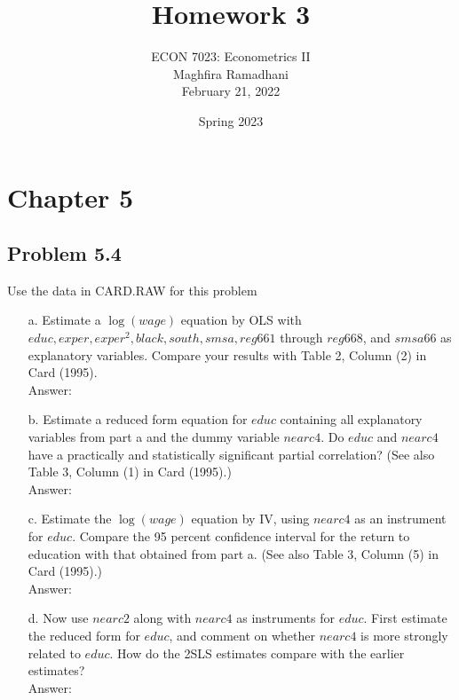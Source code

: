 \documentclass[10pt]{article}
\begin{document}
 
\title{Homework 3}
\author{ECON 7023: Econometrics II\\
Maghfira Ramadhani\\
February 21, 2022}
\date{Spring 2023}
\maketitle

\section*{Chapter 5}
\subsection*{Problem 5.4}
Use the data in CARD.RAW for this problem
\begin{enumerate}
\item[a.] Estimate a $\log(wage)$ equation by OLS with $educ, exper, exper^2, black, south, smsa, reg661$ through $reg668$, and $smsa66$ as explanatory variables. Compare your results with Table 2, Column (2) in Card (1995).
\\ Answer: \\


\item[b.] Estimate a reduced form equation for $educ$ containing all explanatory variables from part a and the dummy variable $nearc4.$ Do $educ$ and $nearc4$ have a practically and statistically significant partial correlation? (See also Table 3, Column (1) in Card (1995).)
\\ Answer:\\


\item[c.] Estimate the $\log(wage)$ equation by IV, using $nearc4$ as an instrument for $educ.$ Compare the 95 percent confidence interval for the return to education with that obtained from part a. (See also Table 3, Column (5) in Card (1995).)
\\ Answer:\\



\item[d.] Now use $nearc2$ along with $nearc4$ as instruments for $educ$. First estimate the reduced form for $educ$, and comment on whether $nearc4$ is more strongly related to $educ$. How do the 2SLS estimates compare with the earlier estimates?
\\ Answer:\\


\end{enumerate}
\end{document}
